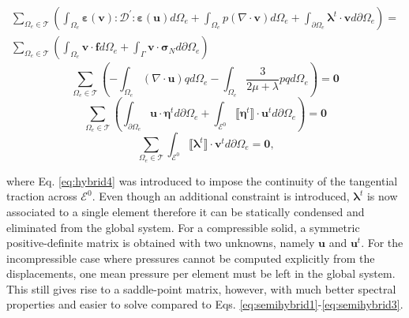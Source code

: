 \documentclass{wccm2024}
\begin{document}
\begin{equation} \label{eq:hybrid1}
    \begin{split}
        \sum_{\Omega_e \in \mathcal{T}} \left( \int_{\Omega_e} \boldsymbol{\varepsilon}(\mathbf{v}) : \mathcal{D}^{'} : \boldsymbol{\varepsilon}(\mathbf{u}) d\Omega_e + \int_{\Omega_e} p (\nabla \cdot \mathbf{v}) d\Omega_e + \int_{\partial\Omega_e} \boldsymbol{\lambda}^t \cdot \mathbf{v} d\partial\Omega_e \right) = \\ \sum_{\Omega_e \in \mathcal{T}} \left( \int_{\Omega_e} \mathbf{v} \cdot \mathbf{f} d\Omega_e + \int_{\Gamma} \mathbf{v} \cdot \boldsymbol{\sigma}_N d\partial\Omega_e \right)
    \end{split}
\end{equation}
\begin{equation} \label{eq:hybrid2}
    \sum_{\Omega_e \in \mathcal{T}} \left(-\int_{\Omega_e} (\nabla \cdot \mathbf{u}) q d\Omega_e -\int_{\Omega_e} \frac{3}{2\mu+\lambda}p q d\Omega_e \right) = \mathbf{0}
\end{equation}
\begin{equation} \label{eq:hybrid3}
    \sum_{\Omega_e \in \mathcal{T}} \left(\int_{\partial\Omega_e} \mathbf{u} \cdot \boldsymbol{\eta}^t d\partial\Omega_e + \int_{\mathcal{E}^0} \llbracket \boldsymbol{\eta}^t \rrbracket \cdot \mathbf{u}^t d\partial\Omega_e \right) = \mathbf{0}
\end{equation}
\begin{equation} \label{eq:hybrid4}
    \sum_{\Omega_e \in \mathcal{T}} \int_{\mathcal{E}^0} \llbracket \boldsymbol{\lambda}^t \rrbracket \cdot \mathbf{v}^t d\partial\Omega_e = \mathbf{0} \text{,}
\end{equation}

\noindent where Eq. \eqref{eq:hybrid4} was introduced to impose the continuity of the tangential traction across $\mathcal{E}^0$. Even though an additional constraint is introduced, $\boldsymbol{\lambda}^t$ is now associated to a single element therefore it can be statically condensed and eliminated from the global system. For a compressible solid, a symmetric positive-definite matrix is obtained with two unknowns, namely $\mathbf{u}$ and $\mathbf{u}^t$. For the incompressible case where pressures cannot be computed explicitly from the displacements, one mean pressure per element must be left in the global system. This still gives rise to a saddle-point matrix, however, with much better spectral properties and easier to solve compared to Eqs. \eqref{eq:semihybrid1}-\eqref{eq:semihybrid3}.
\end{document}
